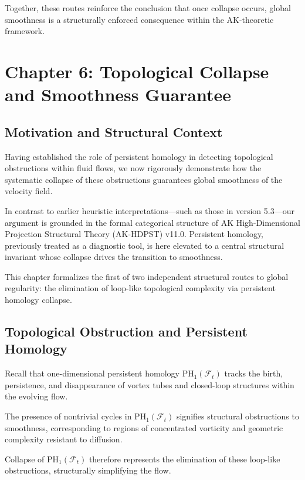 \documentclass[11pt]{article}
\begin{document}
Together, these routes reinforce the conclusion that once collapse occurs, global smoothness is a structurally enforced consequence within the AK-theoretic framework.



\section{Chapter 6: Topological Collapse and Smoothness Guarantee}

\subsection{Motivation and Structural Context}

Having established the role of persistent homology in detecting topological obstructions within fluid flows, we now rigorously demonstrate how the systematic collapse of these obstructions guarantees global smoothness of the velocity field.

In contrast to earlier heuristic interpretations—such as those in version 5.3—our argument is grounded in the formal categorical structure of AK High-Dimensional Projection Structural Theory (AK-HDPST) v11.0. Persistent homology, previously treated as a diagnostic tool, is here elevated to a central structural invariant whose collapse drives the transition to smoothness.

This chapter formalizes the first of two independent structural routes to global regularity: the elimination of loop-like topological complexity via persistent homology collapse.

\subsection{Topological Obstruction and Persistent Homology}

Recall that one-dimensional persistent homology \( \mathrm{PH}_1(\mathcal{F}_t) \) tracks the birth, persistence, and disappearance of vortex tubes and closed-loop structures within the evolving flow.

The presence of nontrivial cycles in \( \mathrm{PH}_1(\mathcal{F}_t) \) signifies structural obstructions to smoothness, corresponding to regions of concentrated vorticity and geometric complexity resistant to diffusion.

Collapse of \( \mathrm{PH}_1(\mathcal{F}_t) \) therefore represents the elimination of these loop-like obstructions, structurally simplifying the flow.
\end{document}
